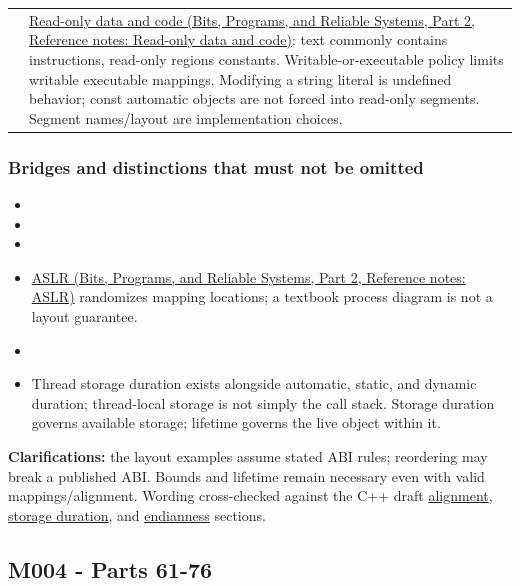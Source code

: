 {\begin{longtable}[]{@{}
  >{\raggedright\arraybackslash}p{}
  >{\raggedright\arraybackslash}p{}@{}}
60 & \href{../01-Bits-Programs-and-Reliable-Systems-P02/main.pdf\#nameddest=appendix-5f9e5e2f0a5e}{Read-only data and code (Bits, Programs, and Reliable Systems, Part 2, Reference notes: Read-only data and code)}: text commonly contains instructions, read-only regions constants. Writable-or-executable policy limits writable executable mappings. Modifying a string literal is undefined behavior; const automatic objects are not forced into read-only segments. Segment names/layout are implementation choices. \\
\end{longtable}
}

\subsubsection{Bridges and distinctions that must not be omitted}\label{appendix-fd090d982a15-bridges-and-distinctions-that-must-not-be-omitted}

\hypertarget{appendix-fd090d982a15-bridges-and-distinctions-that-must-not-be-omitted}{}

\begin{itemize}
\tightlist
\item
\item
\item
\item
  \href{../01-Bits-Programs-and-Reliable-Systems-P02/main.pdf\#nameddest=appendix-78cb248c8355}{ASLR (Bits, Programs, and Reliable Systems, Part 2, Reference notes: ASLR)} randomizes mapping locations; a textbook process diagram is not a layout guarantee.
\item
\item
  Thread storage duration exists alongside automatic, static, and dynamic duration; thread-local storage is not simply the call stack. Storage duration governs available storage; lifetime governs the live object within it.
\end{itemize}

\textbf{Clarifications:} the layout examples assume stated ABI rules; reordering may break a published ABI. Bounds and lifetime remain necessary even with valid mappings/alignment. Wording cross-checked against the C++ draft \href{https://eel.is/c++draft/basic.align}{alignment}, \href{https://eel.is/c++draft/basic.stc}{storage duration}, and \href{https://eel.is/c++draft/bit.endian}{endianness} sections.

\subsection{M004 - Parts 61-76}\label{appendix-fd090d982a15-m004---parts-61-76}

